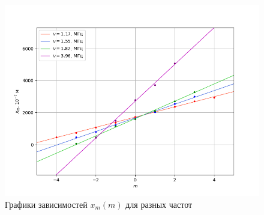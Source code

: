 \documentclass{article}
\begin{document}
\begin{enumerate}
  \begin{figure}[h!]
	\includegraphics[scale=0.8]{Figure_1!!!.png}
	\centering
	\caption{Графики зависимостей $x_m(m)$ для разных частот }
\end{figure}



\end{enumerate}
\end{document}
